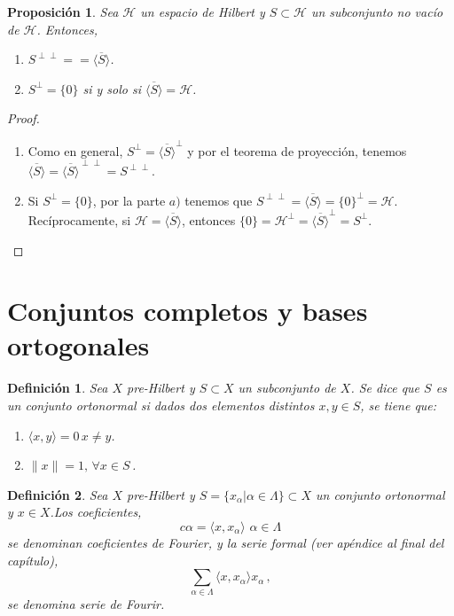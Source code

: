 \documentclass[12pt]{book}
\newtheorem{defn}{\bf Definición}[chapter]
\newtheorem{prop}{\bf Proposición}[chapter]
\newcommand{\norm}[1]{\lVert #1\rVert }
\newcommand{\lin}[1]{\langle #1 \rangle}
\begin{document}
\begin{prop}Sea $\mathcal{H}$ un espacio de Hilbert y  $S\subset \mathcal{H}$ un subconjunto no vacío de $\mathcal{H}$. Entonces,
\begin{enumerate}
\renewcommand{\labelenumi}{\alph{enumi})}
\item  $S^{\perp\perp}==\overline{\lin{S}}$.
\item $S^\perp=\{0\}$ si y solo si $\overline{\lin{S}}=\mathcal{H}$.
\end{enumerate}
\end{prop}
 \begin{proof}
 \begin{enumerate}
 \renewcommand{\labelenumi}{\alph{enumi})}
 \item Como en general, $S^\perp=\overline{\lin{S}}^\perp$ y por el teorema de proyección, tenemos $\overline{\lin{S}}=\overline{\lin{S}}^{\perp\perp}=S^{\perp\perp}$.
  
 
 \item Si $S^\perp=\{ 0\}$, por la parte $a)$ tenemos que  $S^{\perp\perp}=\overline{\lin{S}}=\{0\}^\perp=\mathcal{H}$.
 Recíprocamente,  si $\mathcal{H}=\overline{\lin{S}}$, entonces $\{0\}=\mathcal{H}^\perp=\overline{\lin{S}}^\perp=S^\perp$.
\end{enumerate}
\end{proof}
 \section{Conjuntos completos y bases ortogonales}
 
 \begin{defn} Sea $X$  pre-Hilbert y $S\subset X$ un subconjunto de $X$. Se dice que $S$ es un  {\emph conjunto ortonormal}  si dados dos elementos distintos $x,y\in S$, se tiene que:
 
 \begin{enumerate}
 \renewcommand{\labelenumi}{\alph{enumi})}
 \item $\lin{x,y}=0\, x\not= y$.
 \item $\norm{x}=1, \,\forall x\in S\,$.
 \end{enumerate} 
\end{defn}


\begin{defn} Sea $X$ pre-Hilbert y $S=\{x_\alpha|\alpha \in \Lambda\}\subset X$ un conjunto ortonormal  y $x\in X$.Los coeficientes,
$$c\alpha=\lin{ x, x_\alpha}\,\,\alpha\in\Lambda$$
se denominan {\emph coeficientes de Fourier}, y la serie formal (ver apéndice al final del capítulo),
$$\sum_{\alpha\in \Lambda} \lin{x,x_\alpha} x_\alpha\,,$$  se denomina {\emph serie de Fourir}.
\end{defn}
\end{document}
